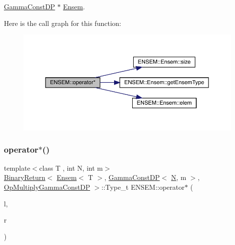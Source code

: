 \mbox{\hyperlink{classENSEM_1_1GammaConstDP}{Gamma\+Const\+DP}} $\ast$ \mbox{\hyperlink{classENSEM_1_1Ensem}{Ensem}}. 

Here is the call graph for this function\+:\nopagebreak
\begin{figure}[H]
\begin{center}
\leavevmode
\includegraphics[width=350pt]{d1/d9e/group__eensem_ga60f93a7eee86e9559faa6e162cf9b9a1_cgraph}
\end{center}
\end{figure}
\mbox{\label{group__eensem_ga0377e46872c4fb569a240b0b60ef577e}} 
\subsubsection{\texorpdfstring{operator$\ast$()}{operator*()}\hspace{0.1cm}{\footnotesize\ttfamily [9/11]}}
{\footnotesize\ttfamily template$<$class T , int N, int m$>$ \\
\mbox{\hyperlink{structENSEM_1_1BinaryReturn}{Binary\+Return}}$<$ \mbox{\hyperlink{classENSEM_1_1Ensem}{Ensem}}$<$ T $>$, \mbox{\hyperlink{classENSEM_1_1GammaConstDP}{Gamma\+Const\+DP}}$<$ \mbox{\hyperlink{operator__name__util_8cc_a7722c8ecbb62d99aee7ce68b1752f337}{N}}, m $>$, \mbox{\hyperlink{structENSEM_1_1OpMultiplyGammaConstDP}{Op\+Multiply\+Gamma\+Const\+DP}} $>$\+::Type\+\_\+t E\+N\+S\+E\+M\+::operator$\ast$ (\begin{DoxyParamCaption}\item[{const \mbox{\hyperlink{classENSEM_1_1Ensem}{Ensem}}$<$ T $>$ \&}]{l,  }\item[{const \mbox{\hyperlink{classENSEM_1_1GammaConstDP}{Gamma\+Const\+DP}}$<$ \mbox{\hyperlink{operator__name__util_8cc_a7722c8ecbb62d99aee7ce68b1752f337}{N}}, m $>$ \&}]{r }\end{DoxyParamCaption})\hspace{0.3cm}{\ttfamily [inline]}}



